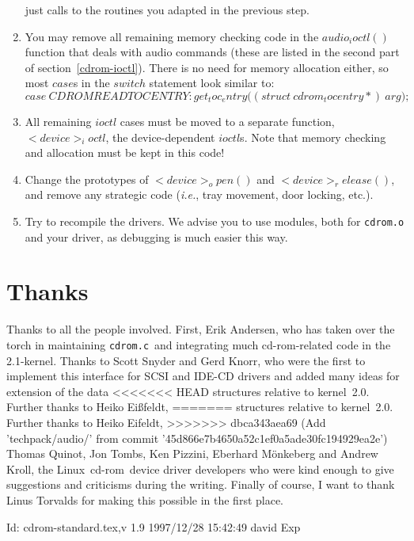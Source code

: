 \documentclass{article}
\def\version{$Id: cdrom-standard.tex,v 1.9 1997/12/28 15:42:49 david Exp $}
\newcommand{\newsection}[1]{\newpage\section{#1}}
\def\linux{{\sc Linux}}
\def\cdrom{{\sc cd-rom}}
\def\cdromc{{\tt {cdrom.c}}}
\def\fo{\sl}                    %
\def\ie{{\fo i.e.}}
\begin{document}
\begin{enumerate}
  just calls to the routines you adapted in the previous step.
\item You may remove all remaining memory checking code in the
  $audio_ioctl()$ function that deals with audio commands (these are
  listed in the second part of section~\ref{cdrom-ioctl}). There is no
  need for memory allocation either, so most $case$s in the $switch$
  statement look similar to:
  $$
  case\ CDROMREADTOCENTRY\colon get_toc_entry\bigl((struct\ 
  cdrom_tocentry *{})\ arg\bigr);
  $$
\item All remaining $ioctl$ cases must be moved to a separate
  function, $<device>_ioctl$, the device-dependent $ioctl$s. Note that
  memory checking and allocation must be kept in this code!
\item Change the prototypes of $<device>_open()$ and
  $<device>_release()$, and remove any strategic code (\ie, tray
  movement, door locking, etc.).
\item Try to recompile the drivers. We advise you to use modules, both
  for {\tt {cdrom.o}} and your driver, as debugging is much easier this
  way.
\end{enumerate} 

\newsection{Thanks}

Thanks to all the people involved.  First, Erik Andersen, who has
taken over the torch in maintaining \cdromc\ and integrating much
\cdrom-related code in the 2.1-kernel.  Thanks to Scott Snyder and
Gerd Knorr, who were the first to implement this interface for SCSI
and IDE-CD drivers and added many ideas for extension of the data
<<<<<<< HEAD
structures relative to kernel~2.0.  Further thanks to Heiko Ei{\ss}feldt,
=======
structures relative to kernel~2.0.  Further thanks to Heiko Ei{\sz}feldt,
>>>>>>> dbca343aea69 (Add 'techpack/audio/' from commit '45d866e7b4650a52c1ef0a5ade30fc194929ea2e')
Thomas Quinot, Jon Tombs, Ken Pizzini, Eberhard M\"onkeberg and Andrew
Kroll, the \linux\ \cdrom\ device driver developers who were kind
enough to give suggestions and criticisms during the writing. Finally
of course, I want to thank Linus Torvalds for making this possible in
the first place.

\vfill
$ \version\ $
\eject
\end{document}
